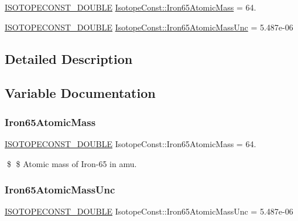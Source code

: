 \begin{DoxyCompactItemize}
\item 
\mbox{\hyperlink{group___isotope_const-_macros_ga8f45a7272ce02c0b4c65c44636ed719a}{I\+S\+O\+T\+O\+P\+E\+C\+O\+N\+S\+T\+\_\+\+D\+O\+U\+B\+LE}} \mbox{\hyperlink{group___isotope_const-_iron-_fe65_ga9be098aff44fd34fcd62f3cae1b17691}{Isotope\+Const\+::\+Iron65\+Atomic\+Mass}} = 64.
\item 
\mbox{\hyperlink{group___isotope_const-_macros_ga8f45a7272ce02c0b4c65c44636ed719a}{I\+S\+O\+T\+O\+P\+E\+C\+O\+N\+S\+T\+\_\+\+D\+O\+U\+B\+LE}} \mbox{\hyperlink{group___isotope_const-_iron-_fe65_gae3465103afe8620f2b75127f5901cc7d}{Isotope\+Const\+::\+Iron65\+Atomic\+Mass\+Unc}} = 5.\+487e-\/06
\end{DoxyCompactItemize}


\subsection{Detailed Description}


\subsection{Variable Documentation}
\mbox{\label{group___isotope_const-_iron-_fe65_ga9be098aff44fd34fcd62f3cae1b17691}} 
\subsubsection{\texorpdfstring{Iron65\+Atomic\+Mass}{Iron65AtomicMass}}
{\footnotesize\ttfamily \mbox{\hyperlink{group___isotope_const-_macros_ga8f45a7272ce02c0b4c65c44636ed719a}{I\+S\+O\+T\+O\+P\+E\+C\+O\+N\+S\+T\+\_\+\+D\+O\+U\+B\+LE}} Isotope\+Const\+::\+Iron65\+Atomic\+Mass = 64.}

\$ \$ Atomic mass of Iron-\/65 in amu. \mbox{\label{group___isotope_const-_iron-_fe65_gae3465103afe8620f2b75127f5901cc7d}} 
\subsubsection{\texorpdfstring{Iron65\+Atomic\+Mass\+Unc}{Iron65AtomicMassUnc}}
{\footnotesize\ttfamily \mbox{\hyperlink{group___isotope_const-_macros_ga8f45a7272ce02c0b4c65c44636ed719a}{I\+S\+O\+T\+O\+P\+E\+C\+O\+N\+S\+T\+\_\+\+D\+O\+U\+B\+LE}} Isotope\+Const\+::\+Iron65\+Atomic\+Mass\+Unc = 5.\+487e-\/06}


